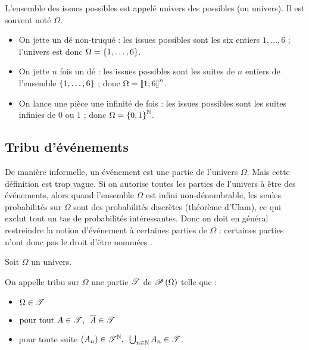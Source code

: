 \begin{defi}
L'ensemble des issues possibles est appelé univers des possibles (ou univers). Il est souvent noté \(\Omega\).
\end{defi}

\begin{ex}
\begin{itemize}
    \item On jette un dé non-truqué : les issues possibles sont les six entiers \(1,\dots,6\) ; l'univers est donc \(\Omega=\accol{1,\dots,6}\). \\
    \item On jette \(n\) fois un dé : les issues possibles sont les suites de \(n\) entiers de l'ensemble \(\accol{1,\dots,6}\) ; donc \(\Omega=\interventierii{1}{6}^n\). \\
    \item On lance une pièce une infinité de fois : les issues possibles sont les suites infinies de \(0\) ou \(1\) ; donc \(\Omega=\accol{0,1}^\N\).
\end{itemize}
\end{ex}

\subsection{Tribu d'événements}

De manière informelle, un événement est une partie de l'univers \(\Omega\). Mais cette définition est trop vague. Si on autorise toutes les parties de l'univers à être des événements, alors quand l'ensemble \(\Omega\) est infini non-dénombrable, les seules probabilités sur \(\Omega\) sont des probabilités discrètes (théorème d'Ulam), ce qui exclut tout un tas de probabilités intéressantes. Donc on doit en général restreindre la notion d'événement à certaines parties de \(\Omega\) : certaines parties n'ont donc pas le droit d'être nommées .

\begin{defi}
Soit \(\Omega\) un univers.

On appelle tribu sur \(\Omega\) une partie \(\fami{T}\) de \(\P{\Omega}\) telle que :

\begin{itemize}
    \item \(\Omega\in\fami{T}\) \\
    \item \(\quantifs{\tpt A\in\fami{T}}\conj{A}\in\fami{T}\) \\
    \item pour toute suite \(\quantifs{\paren{A_n}\in\fami{T}^\N}\bigunion_{n\in\N}A_n\in\fami{T}\).
\end{itemize}
\end{defi}

